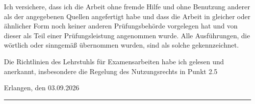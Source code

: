 \documentclass[english,mt]{lmedoc/lmedoc}
\begin{document}
\begin{deckblatt}
\end{deckblatt}

\cleardoublepage
\thispagestyle{empty}
\vspace*{3cm}
\noindent
Ich versichere, dass ich die Arbeit ohne fremde Hilfe und ohne Benutzung
anderer als der angegebenen Quellen angefertigt habe und dass die Arbeit
in gleicher oder ähnlicher Form noch keiner anderen Prüfungsbehörde
vorgelegen hat und von dieser als Teil einer Prüfungsleistung angenommen
wurde. Alle Ausführungen, die wörtlich oder sinngemäß übernommen wurden,
sind als solche gekennzeichnet.

\medskip
\noindent
Die Richtlinien des Lehrstuhls für Examensarbeiten habe ich gelesen und
anerkannt, insbesondere die Regelung des Nutzungsrechts in Punkt 2.5

\vspace{1cm}
\noindent
Erlangen, den 03.09.2026 \hfill \rule{6cm}{0.4pt}

\noindent
\hfill {}
\cleardoublepage


\cleardoublepage


\cleardoublepage

\cleardoublepage


\cleardoublepage
\end{document}
